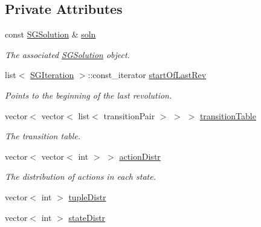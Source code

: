 \subsection*{Private Attributes}
\begin{DoxyCompactItemize}
\item 
\mbox{\label{classSGSimulator_a3aed249e020b601913d94f497328133e}} 
const \hyperlink{classSGSolution}{S\+G\+Solution} \& \hyperlink{classSGSimulator_a3aed249e020b601913d94f497328133e}{soln}
\begin{DoxyCompactList}\small\item\em The associated \hyperlink{classSGSolution}{S\+G\+Solution} object. \end{DoxyCompactList}\item 
\mbox{\label{classSGSimulator_a8623d7c828ff17a8c6ba60e304fdb786}} 
list$<$ \hyperlink{classSGIteration}{S\+G\+Iteration} $>$\+::const\+\_\+iterator \hyperlink{classSGSimulator_a8623d7c828ff17a8c6ba60e304fdb786}{start\+Of\+Last\+Rev}
\begin{DoxyCompactList}\small\item\em Points to the beginning of the last revolution. \end{DoxyCompactList}\item 
vector$<$ vector$<$ list$<$ transition\+Pair $>$ $>$ $>$ \hyperlink{classSGSimulator_a07d836b7d8fdcb2d07731f8c51505522}{transition\+Table}
\begin{DoxyCompactList}\small\item\em The transition table. \end{DoxyCompactList}\item 
vector$<$ vector$<$ int $>$ $>$ \hyperlink{classSGSimulator_a1fb1f41050dfe3067fc42723cdd8b6f2}{action\+Distr}
\begin{DoxyCompactList}\small\item\em The distribution of actions in each state. \end{DoxyCompactList}\item 
vector$<$ int $>$ \hyperlink{classSGSimulator_a36305f5ab359925508878fc86e2ba2fa}{tuple\+Distr}
\item 
vector$<$ int $>$ \hyperlink{classSGSimulator_ac66b6cef3d8ea07e3385b50f827216cf}{state\+Distr}
\item 
\mbox{\label{classSGSimulator_a47c69f11d6f8f3b9a67c74eb7c31b813}} 

\end{DoxyCompactItemize}
